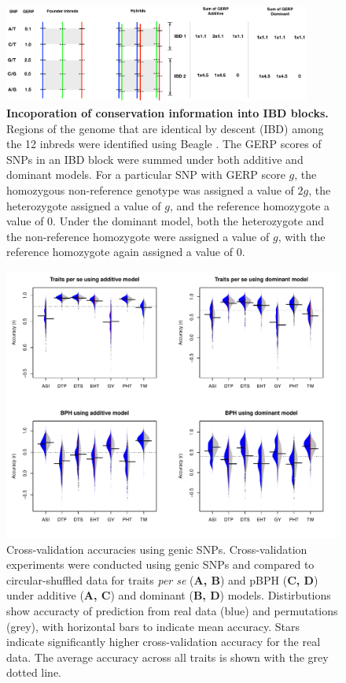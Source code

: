 \documentclass[9pt,twocolumn,twoside]{gsajnl}
\begin{document}
\begin{figure}[h]
\includegraphics[width=0.9\textwidth]{SFig_gerpIBD.pdf}
\caption{
\textbf{Incoporation of conservation information into IBD blocks.}
Regions of the genome that are identical by descent (IBD) among the 12 inbreds were identified using Beagle \citep{Browning2009}.  The GERP scores of SNPs in an IBD block were summed under both additive and dominant models. For a particular SNP with GERP score $g$, the homozygous non-reference genotype was assigned a value of $2g$, the heterozygote assigned a value of $g$, and the reference homozygote a value of 0.  Under the dominant model, both the heterozygote and the non-reference homozygote were assigned a value of $g$, with the reference homozygote again assigned a value of 0.}
\label{fig:gerpibd}
\end{figure}

\begin{figure}[htbp]
\centering
\includegraphics[width=\linewidth]{SFig_genicsnp.pdf}
\caption{Cross-validation accuracies using genic SNPs. Cross-validation experiments were conducted using genic SNPs and compared to circular-shuffled data for traits \emph{per se} (\textbf{A, B}) and pBPH (\textbf{C, D}) under additive (\textbf{A, C}) and dominant (\textbf{B, D}) models. Distirbutions show accuracty of prediction from real data (blue) and permutations (grey), with horizontal bars to indicate mean accuracy.  Stars indicate significantly higher cross-validation accuracy for the real data.  The average accuracy across all traits is shown with the grey dotted line. }
\label{fig:genicsnp}
\end{figure}
\end{document}
